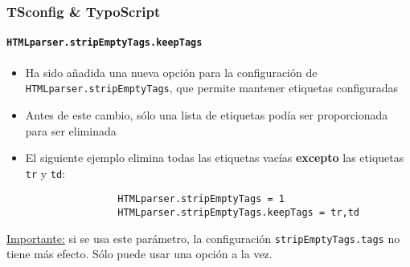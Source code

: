 \begin{frame}[fragile]
	\frametitle{TSconfig \& TypoScript}
	\framesubtitle{\texttt{HTMLparser.stripEmptyTags.keepTags}}

	\lstset{basicstyle=\tiny\ttfamily}

	\begin{itemize}

		\item Ha sido añadida una nueva opción para la configuración de \texttt{HTMLparser.stripEmptyTags},
			que permite mantener etiquetas configuradas
		\item Antes de este cambio, sólo una lista de etiquetas podía ser proporcionada para ser eliminada
		\item El siguiente ejemplo elimina todas las etiquetas vacías \textbf{excepto} las etiquetas \texttt{tr} y \texttt{td}:

			\begin{lstlisting}
				HTMLparser.stripEmptyTags = 1
				HTMLparser.stripEmptyTags.keepTags = tr,td
			\end{lstlisting}

	\end{itemize}

	\underline{Importante:} si se usa este parámetro, la configuración \texttt{stripEmptyTags.tags}
		no tiene más efecto. Sólo puede usar una opción a la vez.

\end{frame}


